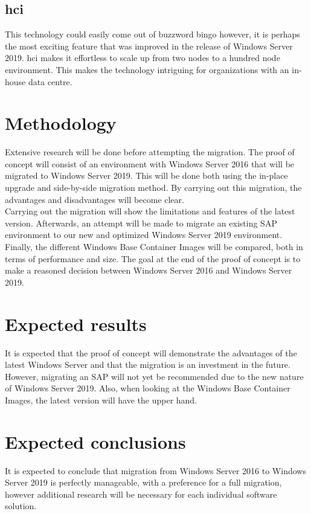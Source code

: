 \subsection{\acrfull{hci}}
This technology could easily come out of buzzword bingo however, it is perhaps the most exciting feature that was improved in the release of Windows Server 2019. 
\acrshort{hci} makes it effortless to scale up from two nodes to a hundred node environment. 
This makes the technology intriguing for organizations with an in-house data centre.
\section{Methodology}\label{sec:methodology}
Extensive research will be done before attempting the migration. The proof of concept will consist of an environment with Windows Server 2016 that will be migrated to Windows Server 2019. This will be done both using the in-place upgrade and side-by-side migration method. By carrying out this migration, the advantages and disadvantages will become clear. \\
Carrying out the migration will show the limitations and features of the latest version. 
Afterwards, an attempt will be made to migrate an existing SAP environment to our new and optimized Windows Server 2019 environment.\\
Finally, the different Windows Base Container Images will be compared, both in terms of performance and size. 
The goal at the end of the proof of concept is to make a reasoned decision between Windows Server 2016 and Windows Server 2019.
\section{Expected results}\label{sec:anticipated_results}
It is expected that the proof of concept will demonstrate the advantages of the latest Windows Server and that the migration is an investment in the future. However, migrating an SAP will not yet be recommended due to the new nature of Windows Server 2019. Also, when looking at the Windows Base Container Images, the latest version will have the upper hand. 
\section{Expected conclusions}\label{sec:anticipated_conclusions}
It is expected to conclude that migration from Windows Server 2016 to Windows Server 2019 is perfectly manageable, with a preference for a full migration,  however additional research will be necessary for each individual software solution. 